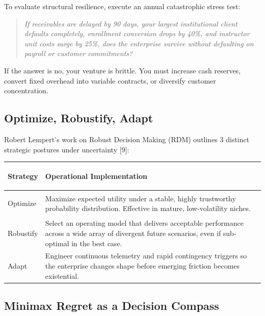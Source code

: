 To evaluate structural resilience, execute an annual catastrophic stress test:

\begin{quote}
\itshape
If receivables are delayed by 90 days, your largest institutional client defaults completely, enrollment conversion drops by 40\%, and instructor unit costs surge by 25\%, does the enterprise survive without defaulting on payroll or customer commitments?
\end{quote}

If the answer is no, your venture is brittle. You must increase cash reserves, convert fixed overhead into variable contracts, or diversify customer concentration.

\subsection{Optimize, Robustify, Adapt}

Robert Lempert's work on Robust Decision Making (RDM) outlines 3 distinct strategic postures under uncertainty [9]:

\begin{tcolorbox}[
  enhanced,
  colback=BayesSurface!60,
  colframe=BayesBorder,
  boxrule=0.5pt,
  arc=3pt,
  left=3pt,right=3pt,top=3pt,bottom=3pt,
  boxsep=1pt
]
\scriptsize
\begin{tabularx}{\linewidth}{>{\bfseries\raggedright\arraybackslash}p{2cm} X}
\toprule
\textbf{Strategy} & \textbf{Operational Implementation} \\
\midrule
Optimize & Maximize expected utility under a stable, highly trustworthy probability distribution. Effective in mature, low-volatility niches. \\
\addlinespace[2pt]
Robustify & Select an operating model that delivers acceptable performance across a wide array of divergent future scenarios, even if sub-optimal in the best case. \\
\addlinespace[2pt]
Adapt & Engineer continuous telemetry and rapid contingency triggers so the enterprise changes shape before emerging friction becomes existential. \\
\bottomrule
\end{tabularx}
\end{tcolorbox}

\subsection{Minimax Regret as a Decision Compass}

